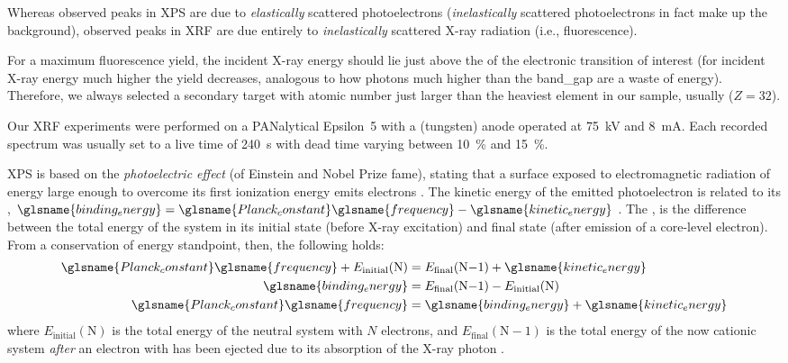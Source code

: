 \documentclass[webedition,openright,titles,swedish,english]{LuaUUThesis}\usepackage[]{graphicx}\usepackage[]{xcolor}
\newcommand{\ie}{i.e.}
\begin{document}
Whereas observed peaks in \gls{XPS} are due to \emph{elastically}
scattered photoelectrons (\emph{inelastically} scattered photoelectrons in fact
make up the background), observed peaks in \gls{XRF} are due entirely to
\emph{inelastically} scattered X-ray radiation (\ie, fluorescence).

For a maximum fluorescence yield, the incident X-ray energy should
lie just above the  of the electronic transition
of interest (for incident X-ray energy much higher the yield decreases, analogous
to how photons much higher than the \gls{band_gap} are a waste of energy).
Therefore, we always selected a secondary target with atomic number just larger
than the heaviest element in our sample, usually  ($Z=\num{32}$).

Our \gls{XRF} experiments were performed on a
PANalytical Epsilon~5 with a  (tungsten) anode
operated at \qty{75}{\kV} and \qty{8}{\mA}.
Each recorded spectrum was usually set to a live time of \qty{240}{\second}
with dead time varying between \qty{10}{\percent} and \qty{15}{\percent}.

\Gls{XPS} is based on the \emph{photoelectric effect} (of Einstein and Nobel Prize fame),
stating that a surface exposed to electromagnetic radiation of energy large enough
to overcome its first ionization energy emits electrons \cite{Einstein1905}.
The kinetic energy of the emitted photoelectron is related to its ,
$\glsname{binding_energy} = \glsname{Planck_constant}\glsname{frequency} - \glsname{kinetic_energy}$
\cite{Einstein1905}.
The , is the difference between the total energy of the system
in its initial state (before X-ray excitation) and final state (after emission of a core-level electron).
From a conservation of energy standpoint, then, the following holds:
\begin{align}\begin{split}\label{eq:xps}
\glsname{Planck_constant}\glsname{frequency} + E_\mathrm{initial}(\mathrm{N}) &= E_\mathrm{final}(\mathrm{N}{-}1) + \glsname{kinetic_energy}\\
\glsname{binding_energy} &= E_\mathrm{final}(\mathrm{N}{-}1) - E_\mathrm{initial}(\mathrm{N})\\
\glsname{Planck_constant}\glsname{frequency} &= \glsname{binding_energy} + \glsname{kinetic_energy}
\end{split}\end{align}
where $E_\mathrm{initial}(\mathrm{N})$ is the total energy of the neutral system with
$N$ electrons, and $E_\mathrm{final}(\mathrm{N}{-}1)$ is the total energy of the
now cationic system \emph{after} an electron with  has been ejected
due to its absorption of the X-ray photon .
\end{document}
